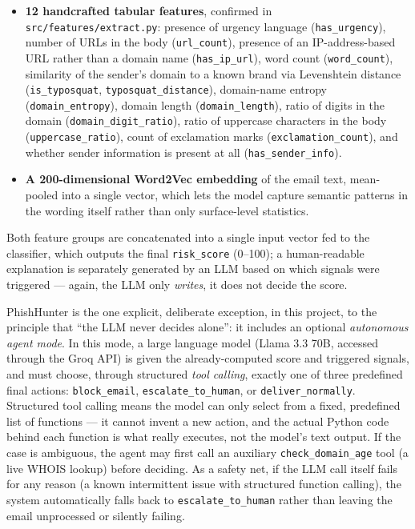 \documentclass[12pt,a4paper]{report}
\begin{document}
\begin{itemize}[nosep]
\item \textbf{12 handcrafted tabular features}, confirmed in \texttt{src/features/extract.py}: presence of urgency language (\texttt{has\_urgency}), number of URLs in the body (\texttt{url\_count}), presence of an IP-address-based URL rather than a domain name (\texttt{has\_ip\_url}), word count (\texttt{word\_count}), similarity of the sender's domain to a known brand via Levenshtein distance (\texttt{is\_typosquat}, \texttt{typosquat\_distance}), domain-name entropy (\texttt{domain\_entropy}), domain length (\texttt{domain\_length}), ratio of digits in the domain (\texttt{domain\_digit\_ratio}), ratio of uppercase characters in the body (\texttt{uppercase\_ratio}), count of exclamation marks (\texttt{exclamation\_count}), and whether sender information is present at all (\texttt{has\_sender\_info}).
\item \textbf{A 200-dimensional Word2Vec embedding} of the email text, mean-pooled into a single vector, which lets the model capture semantic patterns in the wording itself rather than only surface-level statistics.
\end{itemize}

Both feature groups are concatenated into a single input vector fed to the classifier, which outputs the final \texttt{risk\_score} (0--100); a human-readable explanation is separately generated by an LLM based on which signals were triggered --- again, the LLM only \emph{writes}, it does not decide the score.

PhishHunter is the one explicit, deliberate exception, in this project, to the principle that ``the LLM never decides alone'': it includes an optional \emph{autonomous agent mode}. In this mode, a large language model (Llama 3.3 70B, accessed through the Groq API) is given the already-computed score and triggered signals, and must choose, through structured \emph{tool calling}, exactly one of three predefined final actions: \texttt{block\_email}, \texttt{escalate\_to\_human}, or \texttt{deliver\_normally}. Structured tool calling means the model can only select from a fixed, predefined list of functions --- it cannot invent a new action, and the actual Python code behind each function is what really executes, not the model's text output. If the case is ambiguous, the agent may first call an auxiliary \texttt{check\_domain\_age} tool (a live WHOIS lookup) before deciding. As a safety net, if the LLM call itself fails for any reason (a known intermittent issue with structured function calling), the system automatically falls back to \texttt{escalate\_to\_human} rather than leaving the email unprocessed or silently failing.
\end{document}
